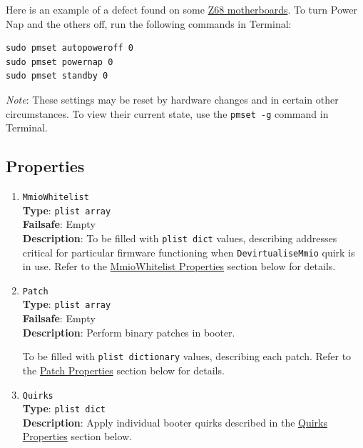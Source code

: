 \documentclass[]{article}
\begin{document}
Here is an example of a defect found on some
\href{http://www.insanelymac.com/forum/topic/329624-need-cmos-reset-after-sleep-only-after-login/#entry2534645}{Z68 motherboards}.
To turn Power Nap and the others off, run the following commands in Terminal:
\begin{lstlisting}[label=powernap, style=ocbash]
sudo pmset autopoweroff 0
sudo pmset powernap 0
sudo pmset standby 0
\end{lstlisting}

\emph{Note}: These settings may be reset by hardware changes and in certain other circumstances.
To view their current state, use the \texttt{pmset -g} command in Terminal.

\subsection{Properties}\label{booterprops}

\begin{enumerate}

\item
  \texttt{MmioWhitelist}\\
  \textbf{Type}: \texttt{plist\ array}\\
  \textbf{Failsafe}: Empty\\
  \textbf{Description}: To be filled with \texttt{plist\ dict} values,
  describing addresses critical for particular firmware functioning when
  \texttt{DevirtualiseMmio} quirk is in use.
  Refer to the \hyperref[booterpropsmmio]{MmioWhitelist Properties} section below for details.

\item
  \texttt{Patch}\\
  \textbf{Type}: \texttt{plist\ array}\\
  \textbf{Failsafe}: Empty\\
  \textbf{Description}: Perform binary patches in booter.

  To be filled with \texttt{plist\ dictionary} values, describing each
  patch. Refer to the \hyperref[booterpropspatch]{Patch Properties} section below for details.

\item
  \texttt{Quirks}\\
  \textbf{Type}: \texttt{plist\ dict}\\
  \textbf{Description}: Apply individual booter quirks described
  in the \hyperref[booterpropsquirks]{Quirks Properties} section below.

\end{enumerate}
\end{document}
